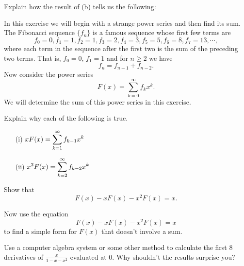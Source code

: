\begin{exercises}
\begin{exerciseSolution}
\end{exerciseSolution}

    \item Explain how the result of (b) tells us the following:

    \ea

\vspace*{5pt}
\nin {}
\vspace*{1pt}

\item In this exercise we will begin with a strange power series and then find its sum. The Fibonacci sequence $\{f_n\}$ is a famous sequence whose first few terms are 
    \[f_0 = 0, f_1 = 1, f_2 = 1, f_3 = 2, f_4 = 3, f_5 = 5, f_6 = 8, f_7 = 13, \cdots,\]
    where each term in the sequence after the first two is the sum of the preceding two terms. That is, $f_0 = 0$, $f_1 = 1$ and for $n \geq 2$ we have 
    \[f_n = f_{n-1} + f_{n-2}.\]
    Now consider the power series 
    \[F(x) = \sum_{k=0}^{\infty} f_kx^k.\]
    We will determine the sum of this power series in this exercise.
    \ba
    \item Explain why each of the following is true.
        \begin{itemize}
        \item[(i)] $\displaystyle xF(x) = \sum_{k=1}^{\infty} f_{k-1}x^k$
        \item[(ii)] $\displaystyle x^2F(x) = \sum_{k=2}^{\infty} f_{k-2}x^k$
        \end{itemize}
    
    \item Show that  
    \[F(x) - xF(x) - x^2F(x) = x.\]
    
    \item Now use the equation 
    \[F(x) - xF(x) - x^2F(x) = x\]
    to find a simple form for $F(x)$ that doesn't involve a sum. 
    
    \item Use a computer algebra system or some other method to calculate the first 8 derivatives of $\frac{x}{1-x-x^2}$ evaluated at 0. Why shouldn't the results surprise you?
    
    \ea
    

\end{exercises}
